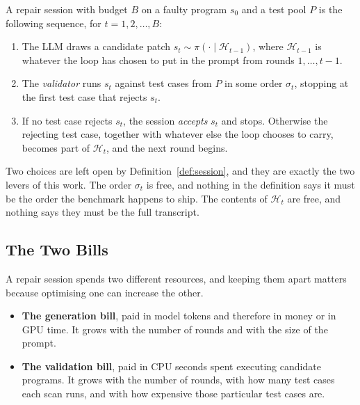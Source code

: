 \begin{definition}
\label{def:session}
A repair session with budget $B$ on a faulty program $s_0$ and a test pool $P$
is the following sequence, for $t = 1,2,\dots,B$:
\begin{enumerate}[leftmargin=*,itemsep=2pt,topsep=3pt]
  \item The LLM draws a candidate patch
        $s_t \sim \pi(\cdot \mid \mathcal{H}_{t-1})$, where $\mathcal{H}_{t-1}$
        is whatever the loop has chosen to put in the prompt from rounds
        $1,\dots,t-1$.
  \item The \emph{validator} runs $s_t$ against test cases from $P$ in some
        order $\sigma_t$, stopping at the first test case that rejects $s_t$.
  \item If no test case rejects $s_t$, the session \emph{accepts} $s_t$ and
        stops. Otherwise the rejecting test case, together with whatever else
        the loop chooses to carry, becomes part of $\mathcal{H}_t$, and the next
        round begins.
\end{enumerate}
\end{definition}

Two choices are left open by Definition~\ref{def:session}, and they are exactly
the two levers of this work. The order $\sigma_t$ is free, and nothing in the
definition says it must be the order the benchmark happens to ship. The contents
of $\mathcal{H}_t$ are free, and nothing says they must be the full transcript.

\subsection{The Two Bills}

A repair session spends two different resources, and keeping them apart matters
because optimising one can increase the other.

\begin{itemize}[leftmargin=*,itemsep=3pt]
\item \textbf{The generation bill}, paid in model tokens and therefore in money
or in GPU time. It grows with the number of rounds and with the size of the
prompt.
\item \textbf{The validation bill}, paid in CPU seconds spent executing
candidate programs. It grows with the number of rounds, with how many test cases
each scan runs, and with how expensive those particular test cases are.
\end{itemize}

